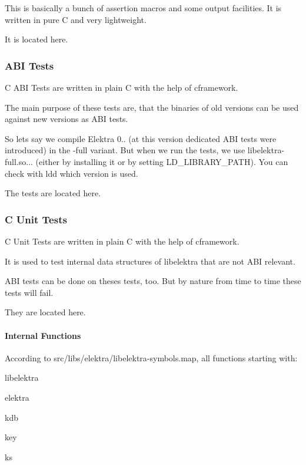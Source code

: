This is basically a bunch of assertion macros and some output facilities. It is written in pure C and very lightweight.

It is located here.

\subsubsection*{A\+BI Tests}

C A\+BI Tests are written in plain C with the help of {\ttfamily cframework}.

The main purpose of these tests are, that the binaries of old versions can be used against new versions as A\+BI tests.

So lets say we compile Elektra 0.. (at this version dedicated A\+BI tests were introduced) in the {\ttfamily -\/full} variant. But when we run the tests, we use {\ttfamily libelektra-\/full.\+so...} (either by installing it or by setting {\ttfamily L\+D\+\_\+\+L\+I\+B\+R\+A\+R\+Y\+\_\+\+P\+A\+TH}). You can check with {\ttfamily ldd} which version is used.

The tests are located here.

\subsubsection*{C Unit Tests}

C Unit Tests are written in plain C with the help of {\ttfamily cframework}.

It is used to test internal data structures of libelektra that are not A\+BI relevant.

A\+BI tests can be done on theses tests, too. But by nature from time to time these tests will fail.

They are located here.

\paragraph*{Internal Functions}

According to {\ttfamily src/libs/elektra/libelektra-\/symbols.\+map}, all functions starting with\+:


\begin{DoxyItemize}
\item libelektra
\item elektra
\item kdb
\item key
\item ks
\end{DoxyItemize}

